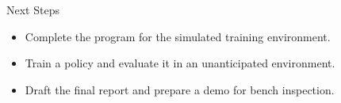 \begin{frame}{Next Steps}

\begin{itemize}
   \item Complete the program for the simulated training environment.
   \item Train a policy and evaluate it in an unanticipated environment.
   \item Draft the final report and prepare a demo for bench inspection.
\end{itemize}

\end{frame}
